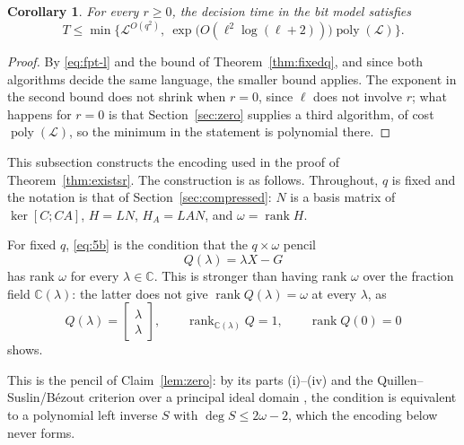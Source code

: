 \documentclass[journal]{IEEEtran}
\theoremstyle{plainn}
\newtheorem{cor}[thm]{Corollary}
\theoremstyle{remark}
\begin{document}
\begin{cor}\label{cor:time}
For every $r\ge0$, the decision time in the bit model satisfies
\begin{equation*}
T\le\min\bigl\{\mathcal L^{O(q^2)},\
\exp\bigl(O(\ell^2\log(\ell+2))\bigr)\operatorname{poly}(\mathcal L)\bigr\}.
\end{equation*}
\end{cor}

\begin{proof}
By \eqref{eq:fpt-l} and the bound of Theorem~\ref{thm:fixedq}, and since both algorithms decide the
same language, the smaller bound applies.
The exponent in the second bound does not shrink when $r=0$, since $\ell$ does not involve $r$; what
happens for $r=0$ is that Section~\ref{sec:zero} supplies a third algorithm, of cost
$\operatorname{poly}(\mathcal L)$, so the minimum in the statement is polynomial there.
\end{proof}


This subsection constructs the encoding used in the proof of Theorem~\ref{thm:existsr}. The construction is as follows. Throughout, $q$ is fixed and the notation is that of Section~\ref{sec:compressed}: $N$ is a basis matrix of $\ker[C;CA]$, $H=LN$, $H_A=LAN$, and $\omega=\operatorname{rank}H$.

For fixed $q$, \eqref{eq:5b} is the condition that the $q\times\omega$ pencil
\begin{equation*}
Q(\lambda)=\lambda X-G
\end{equation*}
has rank $\omega$ for every $\lambda\in\mathbb C$. This is stronger than having rank $\omega$ over the fraction field $\mathbb C(\lambda)$: the latter does not give $\operatorname{rank}Q(\lambda)=\omega$ at every $\lambda$, as
\begin{equation*}
Q(\lambda)=\begin{bmatrix}\lambda\\ \lambda\end{bmatrix},\qquad
\operatorname{rank}_{\mathbb C(\lambda)}Q=1,\qquad \operatorname{rank}Q(0)=0
\end{equation*}
shows.

This is the pencil of Claim~\ref{lem:zero}: by its parts (i)--(iv) and the Quillen--Suslin/B\'ezout
criterion over a principal ideal domain \cite{fab90,lan02}, the condition is equivalent to a
polynomial left inverse $S$ with $\deg S\le2\omega-2$, which the encoding below never forms.
\end{document}
